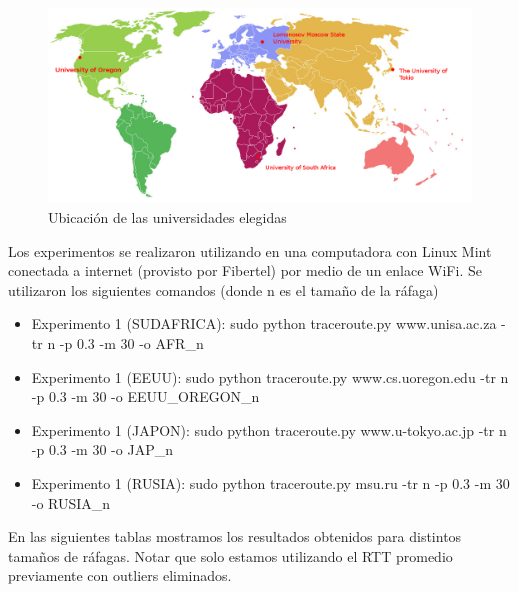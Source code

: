  
\begin{figure}[H]
  \centering
  \includegraphics[scale = 0.3]{imagenes/mapa.png}
  \caption{Ubicación de las universidades elegidas}
  \label{histogramaprobabilidadesModel1}
\end{figure}


Los experimentos se realizaron utilizando en una computadora con Linux Mint conectada a internet (provisto por Fibertel) por medio de un enlace WiFi. Se utilizaron los siguientes comandos (donde n es el tamaño de la ráfaga) 
\begin{itemize}
  \item Experimento 1 (SUDAFRICA): sudo python traceroute.py www.unisa.ac.za    -tr n -p 0.3 -m 30 -o AFR\_n 
  \item Experimento 1 (EEUU):      sudo python traceroute.py www.cs.uoregon.edu -tr n -p 0.3 -m 30 -o EEUU\_OREGON\_n
  \item Experimento 1 (JAPON):     sudo python traceroute.py www.u-tokyo.ac.jp  -tr n -p 0.3 -m 30 -o JAP\_n
  \item Experimento 1 (RUSIA):     sudo python traceroute.py msu.ru             -tr n -p 0.3 -m 30 -o RUSIA\_n
\end{itemize}

En las siguientes tablas mostramos los resultados obtenidos para distintos tamaños de ráfagas. Notar que solo estamos utilizando el RTT promedio previamente con outliers eliminados.

\centering














